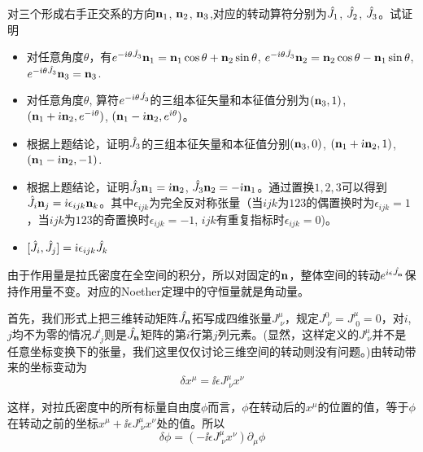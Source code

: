 \documentclass[CJK]{beamer}
\begin{document}
\begin{frame}
\bch
对三个形成右手正交系的方向${\mathbf{n}}_1$, ${\mathbf{n}}_2$, ${\mathbf{n}}_3$,对应的转动算符分别为$\hat{J_{ 1 }} $, $\hat{J_{ 2 }} $, $\hat{J_{ 3 }} $。试证明
\begin{itemize}
\item{对任意角度$\theta$，有$e^{-{\dot{\imath}}\theta\hat{J_{ 3 }} }{\mathbf{n}}_1 =  {\mathbf{n}}_1 \cos\theta + {\mathbf{n}}_2 \sin\theta$, $e^{-{\dot{\imath}}\theta\hat{J_{ 3 }} }{\mathbf{n}}_2 = {\mathbf{n}}_2 \cos\theta - {\mathbf{n}}_1 \sin\theta$, $e^{-{\dot{\imath}}\theta\hat{J_{ 3 }}}{\mathbf{n}}_3 = {\mathbf{n}}_3$. }
\item{对任意角度$\theta$, 算符$e^{-{\dot{\imath}}\theta\hat{J_{ 3 }} }$的三组本征矢量和本征值分别为$({\mathbf{n}}_3, 1)$, $({\mathbf{n}}_1+{\dot{\imath}}{\mathbf{n}}_2, e^{-{\dot{\imath}}\theta})$, $({\mathbf{n}}_1-{\dot{\imath}}{\mathbf{n}}_2, e^{{\dot{\imath}}\theta})$。}
\item{根据上题结论，证明$\hat{J_{ 3 }}$的三组本征矢量和本征值分别$({\mathbf{n}}_3, 0)$, $({\mathbf{n}}_1+{\dot{\imath}}{\mathbf{n}}_2, 1)$, $({\mathbf{n}}_1-{\dot{\imath}}{\mathbf{n}}_2, -1)$}.
\item{根据上题结论，证明$\hat{J_{ 3 }}{\mathbf{n}}_1={\dot{\imath}}{\mathbf{n}}_2$, $\hat{J_{ 3 }} {\mathbf{n}}_2 = -{\dot{\imath}}{\mathbf{n}}_1$。通过置换$1,2,3$可以得到$\hat{J_{ i }}{\mathbf{n}}_j = {\dot{\imath}}\epsilon_{ijk}{\mathbf{n}}_k$。其中$\epsilon_{ijk}$为完全反对称张量（当$ijk$为$123$的偶置换时为$\epsilon_{ijk}=1$，当$ijk$为$123$的奇置换时$\epsilon_{ijk}=-1$, $ijk$有重复指标时$\epsilon_{ijk} = 0$)。}
\item{$[\hat{J_{ i }}, \hat{J_{ j }} ] = {\dot{\imath}} \epsilon_{ijk}\hat{J_{ k }} $}
\end{itemize}
\ech
\end{frame}



\begin{frame}
\bch
由于作用量是拉氏密度在全空间的积分，所以对固定的${\mathbf{n}}$，整体空间的转动$e^{i\epsilon{\hat{J_{\mathbf{n}}}}}$保持作用量不变。对应的Noether定理中的守恒量就是角动量。

\skipline
首先，我们形式上把三维转动矩阵${\hat{J_{\mathbf{n}}}}$拓写成四维张量$J^{\mu}_{\;\nu}$，规定$J^0_{\;\nu} = J^\mu_{\;0} = 0$，对$i$, $j$均不为零的情况$J^i_{\;j}$则是${\hat{J_{\mathbf{n}}}}$矩阵的第$i$行第$j$列元素。(显然，这样定义的$J^\mu_{\;\nu}$并不是任意坐标变换下的张量，我们这里仅仅讨论三维空间的转动则没有问题。)由转动带来的坐标变动为
$$ \delta x^\mu =   \ii \epsilon J^\mu_{\;\nu} x^\nu$$

这样，对拉氏密度中的所有标量自由度$\phi$而言，$\phi$在转动后的$x^\mu$的位置的值，等于$\phi$在转动之前的坐标$x^\mu + \ii\epsilon J^\mu_{\;\nu} x^\nu$处的值。所以
$$\delta \phi = (-\ii \epsilon J^\mu_{\;\nu} x^\nu)\partial_\mu \phi$$

\ech
\end{frame}
\end{document}
